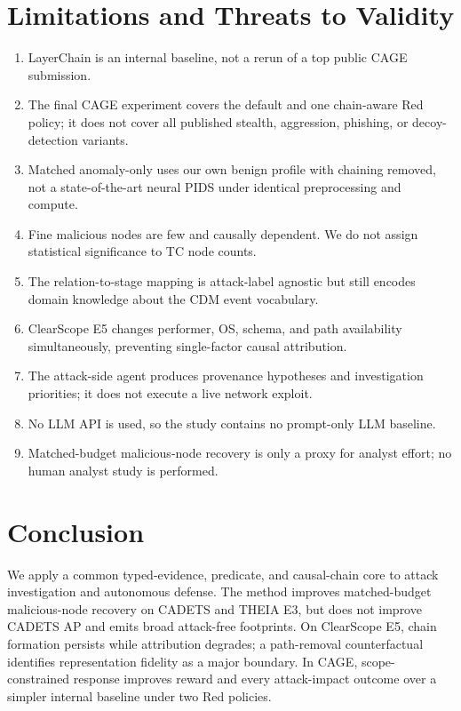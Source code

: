 \documentclass[runningheads]{llncs}
\begin{document}
\section{Limitations and Threats to Validity}

\begin{enumerate}
\item LayerChain is an internal baseline, not a rerun of a top public CAGE submission.
\item The final CAGE experiment covers the default and one chain-aware Red policy; it does not cover all published stealth, aggression, phishing, or decoy-detection variants.
\item Matched anomaly-only uses our own benign profile with chaining removed, not a state-of-the-art neural PIDS under identical preprocessing and compute.
\item Fine malicious nodes are few and causally dependent. We do not assign statistical significance to TC node counts.
\item The relation-to-stage mapping is attack-label agnostic but still encodes domain knowledge about the CDM event vocabulary.
\item ClearScope E5 changes performer, OS, schema, and path availability simultaneously, preventing single-factor causal attribution.
\item The attack-side agent produces provenance hypotheses and investigation priorities; it does not execute a live network exploit.
\item No LLM API is used, so the study contains no prompt-only LLM baseline.
\item Matched-budget malicious-node recovery is only a proxy for analyst effort; no human analyst study is performed.
\end{enumerate}

\section{Conclusion}

We apply a common typed-evidence, predicate, and causal-chain core to attack investigation and autonomous defense. The method improves matched-budget malicious-node recovery on CADETS and THEIA E3, but does not improve CADETS AP and emits broad attack-free footprints. On ClearScope E5, chain formation persists while attribution degrades; a path-removal counterfactual identifies representation fidelity as a major boundary. In CAGE, scope-constrained response improves reward and every attack-impact outcome over a simpler internal baseline under two Red policies.
\end{document}
